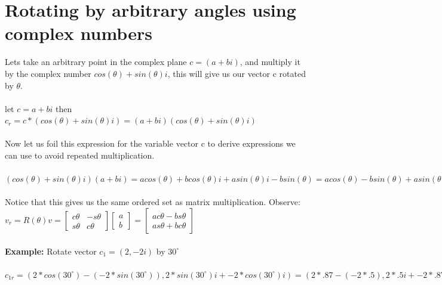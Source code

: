 \documentclass{article}
\begin{document}
\section{Rotating by arbitrary angles using complex numbers}
Lets take an arbitrary point in the complex plane $c=(a+bi)$, and multiply it by the complex number $cos(\theta) + sin(\theta)i$, this will give us our vector c rotated by $\theta$.  \\\\
let $c = a+bi$ then $c_r= c * (cos(\theta) + sin(\theta)i) = (a+bi)(cos(\theta) + sin(\theta)i)$\\\\
Now let us foil this expression for the variable vector c to derive expressions we can use to avoid repeated multiplication.\\\\
$(cos(\theta)+sin(\theta)i)(a+bi)=acos(\theta)+bcos(\theta)i+asin(\theta)i-bsin(\theta)=acos(\theta)-bsin(\theta)+asin(\theta)i+bcos(\theta)i= \mathbf{(acos(\theta)-bsin(\theta), acos(\theta)i+bsin(\theta)i)}$\\\\
Notice that this gives us the same ordered set as matrix multiplication. Observe:\\
$v_r=R(\theta)v=\begin{bmatrix}
c\theta & -s\theta \\
s\theta & c\theta 
\end{bmatrix}\begin{bmatrix}
a\\
b
\end{bmatrix}=\begin{bmatrix}
ac\theta - bs\theta\\
as\theta + bc\theta
\end{bmatrix}$\\\\
\textbf{Example: } Rotate vector $c_1=(2,-2i)$ by $30^\circ$\\\\
$c_{1r}= (2*cos(30^{\circ})-(-2*sin(30^\circ)), 2*sin(30^\circ)i+-2*cos(30^\circ)i)=(2*.87-(-2*.5), 2*.5i + -2*.87i)=(2.74,-.74i)$\\\\
\end{document}

